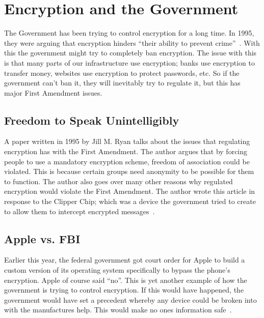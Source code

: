 \documentclass[12pt,a4paper,titlepage]{article}
\begin{document}
\section{Encryption and the Government}
The Government has been trying to control encryption for a long time. In 1995, 
they were arguing that encryption hinders ``their ability to prevent 
crime''~\cite{ryan1995freedom}. With this the government might try to completely
ban encryption. The issue with this is that many parts of our infrastructure use
encryption; banks use encryption to transfer money, websites use encryption to 
protect passwords, etc. So if the government can't ban it, they will inevitably 
try to regulate it, but this has major First Amendment issues.

\subsection{Freedom to Speak Unintelligibly}
A paper written in 1995 by Jill M. Ryan talks about the issues that regulating 
encryption has with the First Amendment. The author argues that by forcing 
people to use a mandatory encryption scheme, freedom of association could be 
violated. This is because certain groups need anonymity to be possible for them 
to function. The author also goes over many other reasons why regulated 
encryption would violate the First Amendment. The author wrote this article in 
response to the Clipper Chip; which was a device the government tried to create 
to allow them to intercept encrypted messages~\cite{ryan1995freedom}.

\subsection{Apple vs. FBI}
Earlier this year, the federal government got court order for Apple to build 
a custom version of its operating system specifically to bypass the phone's 
encryption. Apple of course said ``no''. This is yet another example of how the 
government is trying to control encryption. If this would have happened, the 
government would have set a precedent whereby any device could be broken into 
with the manufactures help. This would make no ones information 
safe~\cite{herman2016fbi}. 

\newpage

\appendix

\newpage
\printbibliography[
heading=bibintoc,
title={Resources}
]
\end{document}
